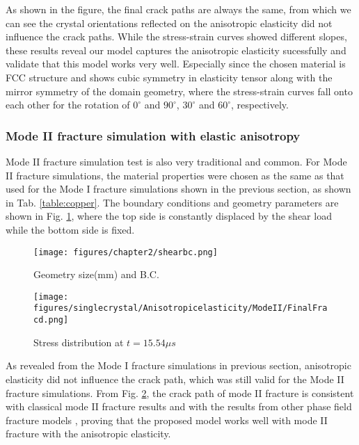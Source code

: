 \documentclass[3p,10pt,sort&compress]{elsarticle}
\begin{document}
As shown in the figure, the final crack paths are always the same, from which we can see the crystal orientations reflected on the anisotropic elasticity did not influence the crack paths. While the stress-strain curves showed different slopes, these results reveal our model captures the anisotropic elasticity sucessfully and validate that this model works very well. Especially since the chosen material is FCC structure and shows cubic symmetry in elasticity tensor along with the mirror symmetry of the domain geometry, where the stress-strain curves fall onto each other for the rotation of $0^{\circ}$ and $90^{\circ}$, $30^{\circ}$ and $60^{\circ}$, respectively.
\subsubsection{Mode II fracture simulation with elastic anisotropy}
Mode II fracture simulation test is also very traditional and common. For Mode II fracture simulations, the material properties were chosen as the same as that used for the Mode I fracture simulations shown in the previous section, as shown in Tab. \ref{table:copper}. The boundary conditions and geometry parameters are shown in Fig. \ref{fig:shearbc}, where the top side is constantly displaced by the shear load while the bottom side is fixed.

\begin{figure*}[!htb]
	\centering
  \begin{subfigure}{0.45\textwidth}
		\texttt{[image: figures/chapter2/shearbc.png]}
		\caption{Geometry size(mm) and B.C.}
	  \label{fig:shearbc}
	\end{subfigure}
	\begin{subfigure}{0.45\textwidth}
		\texttt{[image: figures/singlecrystal/Anisotropicelasticity/ModeII/FinalFracd.png]}
		\caption{Stress distribution at $t=15.54\mu s$}
	  \label{fig:ModeIIcrackstress}
	\end{subfigure}
	\caption{Boundary conditions and geometry parameters for the Mode II fracture simulation shown in Fig. \ref{fig:shearbc}, Crack path(with post processing) and final crack path shown in Fig. \ref{fig:ModeIIcrackstress}.}
  \label{fig:aniso_mode_II}
\end{figure*}


As revealed from the Mode I fracture simulations in previous section, anisotropic elasticity did not influence the crack path, which was still valid for the Mode II fracture simulations. From Fig. \ref{fig:ModeIIcrackstress}, the crack path of mode II fracture is consistent with classical mode II fracture results and with the results from other phase field fracture models \cite{miehe2010phase, bourdin2000numerical}, proving that the proposed model works well with mode II fracture with the anisotropic elasticity.
\end{document}

